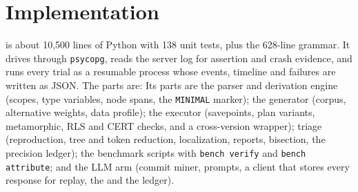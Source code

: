 \section{Implementation}
\label{sec:impl}

\tool is about 10{,}500 lines of Python with 138 unit tests, plus the 628-line
grammar. It drives \pg through \texttt{psycopg}, reads the server log for
assertion and crash evidence, and runs every trial as a resumable process
whose events, timeline and failures are written as JSON. The parts are:
Its parts are the \pgg parser and derivation engine (scopes, type variables,
node spans, the \texttt{MINIMAL} marker); the generator (corpus, alternative
weights, data profile); the executor (savepoints, plan variants, metamorphic,
RLS and CERT checks, and a cross-version wrapper); triage (reproduction, tree
and token reduction, localization, reports, bisection, the precision ledger);
the benchmark scripts with \texttt{bench verify} and \texttt{bench attribute};
and the LLM arm (commit miner, prompts, a client that stores every response for
replay, the \gate and the ledger).
